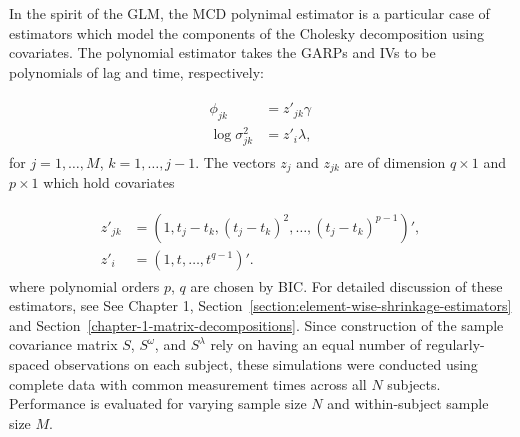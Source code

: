 \bigskip

In the spirit of the GLM, the MCD polynimal estimator is a particular case of estimators which model the components of the Cholesky decomposition using covariates. The polynomial estimator takes the GARPs and IVs to be polynomials of lag and time, respectively:

\begin{align*}
\begin{split}  \label{eq:GARP-IV-parametric-model}
\phi_{jk} &= z'_{jk} \gamma \\
\log \sigma^2_{jk} &= z'_{i}\lambda, 
\end{split}
\end{align*}
\noindent
for $j = 1,\dots, M$, $k = 1,\dots, j-1$. The vectors $z_j$ and $z_{jk}$ are of dimension $q \times 1$ and $p \times 1$  which hold covariates

\begin{align*}
\begin{split} 
z'_{jk} &= \left(1, t_j - t_k, \left(t_j - t_k\right)^2,\dots, \left(t_j - t_k\right)^{p-1}\right)', \\
z'_{i}  &= \left(1, t, \dots, t^{q-1}\right)'.
\end{split}
\end{align*}
\noindent
where polynomial orders $p$, $q$ are chosen by BIC.  For detailed discussion of these estimators, see See Chapter 1, Section~\ref{section:element-wise-shrinkage-estimators} and Section~\ref{chapter-1-matrix-decompositions}.  Since construction of the sample covariance matrix $S$, $S^\omega$, and $S^\lambda$ rely on having an equal number of regularly-spaced observations on each subject, these simulations were conducted using complete data with common measurement times across all $N$ subjects. Performance is evaluated for varying sample size $N$ and within-subject sample size $M$.


